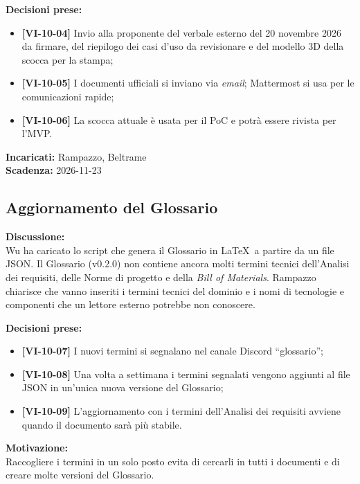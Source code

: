 \documentclass[12pt,a4paper]{article}
\newcommand{\vnum}{10}                     %
\newcommand{\tightlist}{\setlength{\itemsep}{1pt}\setlength{\parskip}{0pt}}
\begin{document}
\textbf{Decisioni prese:}
\begin{itemize}
\tightlist
\item[$\checkmark$] \textbf{[VI-\vnum-04]} Invio alla proponente del verbale esterno del 20 novembre 2026 da firmare, del riepilogo dei casi d'uso da revisionare e del modello 3D della scocca per la stampa;
\item[$\checkmark$] \textbf{[VI-\vnum-05]} I documenti ufficiali si inviano via \emph{email}; Mattermost si usa per le comunicazioni rapide;
\item[$\checkmark$] \textbf{[VI-\vnum-06]} La scocca attuale è usata per il PoC e potrà essere rivista per l'MVP.
\end{itemize}

\textbf{Incaricati:} Rampazzo, Beltrame\\
\textbf{Scadenza:} 2026-11-23

\hypertarget{odg-3}{%
\subsection{Aggiornamento del Glossario}}

\textbf{Discussione:}\\
Wu ha caricato lo script che genera il Glossario in \LaTeX\ a partire da un file JSON. Il Glossario (v0.2.0) non contiene ancora molti termini tecnici dell'Analisi dei requisiti, delle Norme di progetto e della \textit{Bill of Materials}. Rampazzo chiarisce che vanno inseriti i termini tecnici del dominio e i nomi di tecnologie e componenti che un lettore esterno potrebbe non conoscere.

\textbf{Decisioni prese:}
\begin{itemize}
\tightlist
\item[$\checkmark$] \textbf{[VI-\vnum-07]} I nuovi termini si segnalano nel canale Discord ``glossario'';
\item[$\checkmark$] \textbf{[VI-\vnum-08]} Una volta a settimana i termini segnalati vengono aggiunti al file JSON in un'unica nuova versione del Glossario;
\item[$\checkmark$] \textbf{[VI-\vnum-09]} L'aggiornamento con i termini dell'Analisi dei requisiti avviene quando il documento sarà più stabile.
\end{itemize}

\textbf{Motivazione:}\\
Raccogliere i termini in un solo posto evita di cercarli in tutti i documenti e di creare molte versioni del Glossario.
\end{document}
